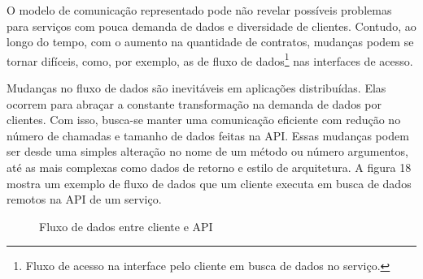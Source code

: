 O modelo de comunicação representado pode não revelar possíveis problemas para serviços com pouca demanda de dados e diversidade de clientes. Contudo, ao longo do tempo, com o aumento na quantidade de contratos, mudanças podem se tornar difíceis, como, por exemplo, as de fluxo de dados\footnote{
  Fluxo de acesso na interface pelo cliente em busca de dados no serviço.
} nas interfaces de acesso.

Mudanças no fluxo de dados são inevitáveis em aplicações distribuídas. Elas ocorrem para abraçar a constante transformação na demanda de dados por clientes. Com isso, busca-se manter uma comunicação eficiente com redução no número de chamadas e tamanho de dados feitas na API. Essas mudanças podem ser desde uma simples alteração no nome de um método ou número argumentos, até as mais complexas como dados de retorno e estilo de arquitetura. A figura 18 mostra um exemplo de fluxo de dados que um cliente executa em busca de dados remotos na API de um serviço.

\begin{figure}[H]
  \centering
  \caption{Fluxo de dados entre cliente e API}
\end{figure}

